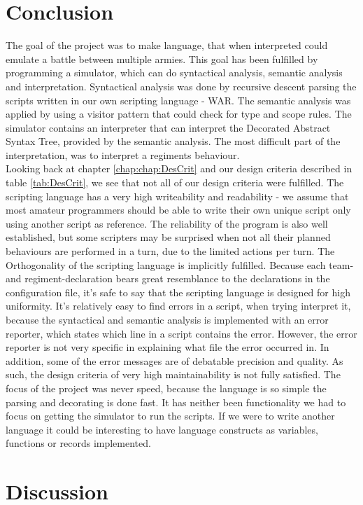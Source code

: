 \section{Conclusion}
	The goal of the project was to make language, that when interpreted could emulate a battle between multiple armies. 
	This goal has been fulfilled by programming a simulator, which can do syntactical analysis, semantic analysis and interpretation.
	Syntactical analysis was done by recursive descent parsing the scripts written in our own scripting language - WAR. The semantic analysis was applied by using 
	a visitor pattern that could check for type and scope rules. The simulator contains an interpreter that can interpret the Decorated Abstract Syntax Tree, provided by the semantic analysis.
	The most difficult part of the interpretation, was to interpret a regiments behaviour. \\
	
	Looking back at chapter \ref{chap:chap:DesCrit} and our design criteria described in table \ref{tab:DesCrit}, we see that not all of our design criteria were fulfilled. The scripting language has a very high writeability and readability - we assume that most amateur programmers should be able to write their own unique script only using another script as reference. The reliability of the program is also well established, but some scripters may be surprised when not all their planned behaviours are performed in a turn, due to the limited actions per turn. The Orthogonality of the scripting language is implicitly fulfilled. Because each team- and regiment-declaration bears great resemblance to the declarations in the configuration file, it's safe to say that the scripting language is designed for high uniformity. It's relatively easy to find errors in a script, when trying interpret it, because the syntactical and semantic analysis is implemented with an error reporter, which states which line in a script contains the error. However, the error reporter is not very specific in explaining what file the error occurred in. In addition, some of the error messages are of debatable precision and quality. As such, the design criteria of very high maintainability is not fully satisfied.
	The focus of the project was never speed, because the language is so simple the parsing and decorating is done fast.
	It has neither been functionality we had to focus on getting the simulator to run the scripts. If we were to write another language 
	it could be interesting to have language constructs as variables, functions or records implemented.
	 



\section{Discussion}
